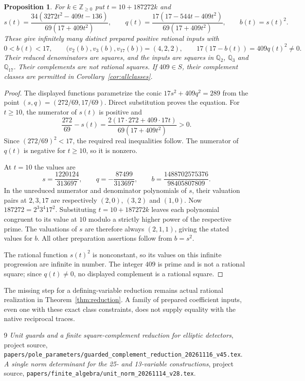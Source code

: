 \documentclass[11pt,a4paper]{article}
\newtheorem{proposition}[theorem]{Proposition}
\newcommand{\Q}{\mathbb Q}\newcommand{\Z}{\mathbb Z}
\begin{document}
\begin{proposition}\label{prop:family}
For $k\in\Z_{\ge0}$ put $t=10+187272k$ and
\[
 s(t)=\frac{34(3272t^2-409t-136)}{69(17+409t^2)},\qquad
 q(t)=\frac{17(17-544t-409t^2)}{69(17+409t^2)},
 \qquad b(t)=s(t)^2.
\]
These give infinitely many distinct prepared positive rational inputs
with
\[
 0<b(t)<17,\qquad
 \bigl(v_2(b),v_3(b),v_{17}(b)\bigr)=(4,2,2),
 \qquad17(17-b(t))=409q(t)^2\ne0.
\]
Their reduced denominators are squares, and the inputs are squares in
$\Q_2$, $\Q_3$ and $\Q_{17}$. Their complements are not rational
squares. If $409\in S$, their complement classes are permitted in
Corollary~\ref{cor:allclasses}.
\end{proposition}
\begin{proof}
The displayed functions parametrize the conic
$17s^2+409q^2=289$ from the point
$(s,q)=(272/69,17/69)$. Direct substitution proves the equation.
For $t\ge10$, the numerator of $s(t)$ is positive and
\[
 \frac{272}{69}-s(t)
   =\frac{2(17\cdot272+409\cdot17t)}{69(17+409t^2)}>0.
\]
Since $(272/69)^2<17$, the required real inequalities follow.
The numerator of $q(t)$ is negative for $t\ge10$, so it is nonzero.

At $t=10$ the values are
\[
 s=\frac{1220124}{313697},\qquad
 q=-\frac{87499}{313697},\qquad
 b=\frac{1488702575376}{98405807809}.
\]
In the unreduced numerator and denominator polynomials of $s$, their
valuation pairs at $2,3,17$ are respectively $(2,0)$, $(3,2)$ and
$(1,0)$. Now $187272=2^3 3^4 17^2$. Substituting
$t=10+187272k$ leaves each polynomial congruent to its value at $10$
modulo a strictly higher power of the respective prime. The valuations
of $s$ are therefore always $(2,1,1)$, giving the stated values for $b$.
All other preparation assertions follow from $b=s^2$.

The rational function $s(t)^2$ is nonconstant, so its values on this
infinite progression are infinite in number. The integer $409$ is prime
and is not a rational square; since $q(t)\ne0$, no displayed complement
is a rational square.
\end{proof}

The missing step for a defining-variable reduction remains actual
rational realization in Theorem~\ref{thm:reduction}. A family of prepared
coefficient inputs, even one with these exact class constraints, does
not supply equality with the native reciprocal traces.

\begin{thebibliography}{9}
\emph{Unit guards and a finite square-complement reduction for elliptic detectors},
project source,
\nolinkurl{papers/pole_parameters/guarded_complement_reduction_20261116_v45.tex}.
\emph{A single norm determinant for the 25- and 13-variable constructions},
project source,
\nolinkurl{papers/finite_algebra/unit_norm_20261114_v28.tex}.
\end{thebibliography}
\end{document}

